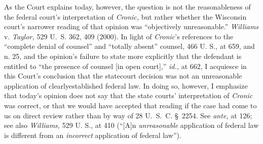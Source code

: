   As the Court explains today, however, the question is not the reasonableness of the federal court's interpretation of \emph{Cronic,} but rather whether the Wisconsin court's narrower reading of that opinion was ``objectively unreasonable.'' \emph{Williams} v. \emph{Taylor,} 529 U.~S. 362, 409 (2000). In light of \emph{Cronic}'s references to the ``complete denial of counsel'' and ``totally absent'' counsel, 466 U. S., at 659, and n. 25, and the opinion's failure to state more explicitly that the defendant is entitled to ``the presence of counsel [in open court],'' \emph{id.,} at 662, I acquiesce in this Court's conclusion that the statecourt decision was not an unreasonable application of clearly\newpage established federal law. In doing so, however, I emphasize that today's opinion does not say that the state courts' interpretation of \emph{Cronic} was correct, or that we would have accepted that reading if the case had come to us on direct review rather than by way of 28 U.~S.~C. \S~2254. See \emph{ante,} at 126; see also \emph{Williams,} 529 U. S., at 410 (``[A]n \emph{unreasonable} application of federal law is different from an \emph{incorrect} application of federal law'').
